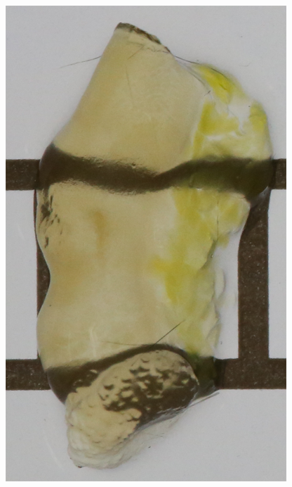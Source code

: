 \begin{figure}[H]
	\centering
	\begin{minipage}[b]{0.4\columnwidth}
		\centering
		\includegraphics[clip, angle=90, width=\linewidth]{fig/chapter1/colon_lucid}
	\end{minipage}
	\begin{minipage}[b]{0.4\columnwidth}
		\centering

\end{minipage}
\end{figure}
